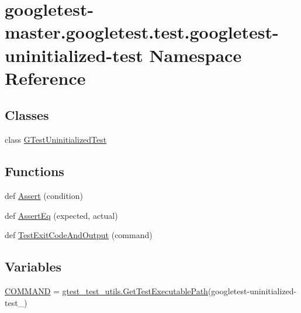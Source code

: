 \hypertarget{namespacegoogletest-master_1_1googletest_1_1test_1_1googletest-uninitialized-test}{}\section{googletest-\/master.googletest.\+test.\+googletest-\/uninitialized-\/test Namespace Reference}
\label{namespacegoogletest-master_1_1googletest_1_1test_1_1googletest-uninitialized-test}
\subsection*{Classes}
\begin{DoxyCompactItemize}
\item 
class \mbox{\hyperlink{classgoogletest-master_1_1googletest_1_1test_1_1googletest-uninitialized-test_1_1_g_test_uninitialized_test}{G\+Test\+Uninitialized\+Test}}
\end{DoxyCompactItemize}
\subsection*{Functions}
\begin{DoxyCompactItemize}
\item 
def \mbox{\hyperlink{namespacegoogletest-master_1_1googletest_1_1test_1_1googletest-uninitialized-test_adc0c9389f0e77548cd19c9d6ca7c941e}{Assert}} (condition)
\item 
def \mbox{\hyperlink{namespacegoogletest-master_1_1googletest_1_1test_1_1googletest-uninitialized-test_ad32e5b45b8a3c2749c5379633b6609c6}{Assert\+Eq}} (expected, actual)
\item 
def \mbox{\hyperlink{namespacegoogletest-master_1_1googletest_1_1test_1_1googletest-uninitialized-test_a7d8c88e7b8d629dec2908e7748795959}{Test\+Exit\+Code\+And\+Output}} (command)
\end{DoxyCompactItemize}
\subsection*{Variables}
\begin{DoxyCompactItemize}
\item 
\mbox{\hyperlink{namespacegoogletest-master_1_1googletest_1_1test_1_1googletest-uninitialized-test_abdc655624c6be49a767d6f61a400db1b}{C\+O\+M\+M\+A\+ND}} = \mbox{\hyperlink{namespacegoogletest-master_1_1googletest_1_1test_1_1gtest__test__utils_a78bbc69ac699e750a6a29188caa643c4}{gtest\+\_\+test\+\_\+utils.\+Get\+Test\+Executable\+Path}}(\textquotesingle{}googletest-\/uninitialized-\/test\+\_\+\textquotesingle{})
\end{DoxyCompactItemize}



